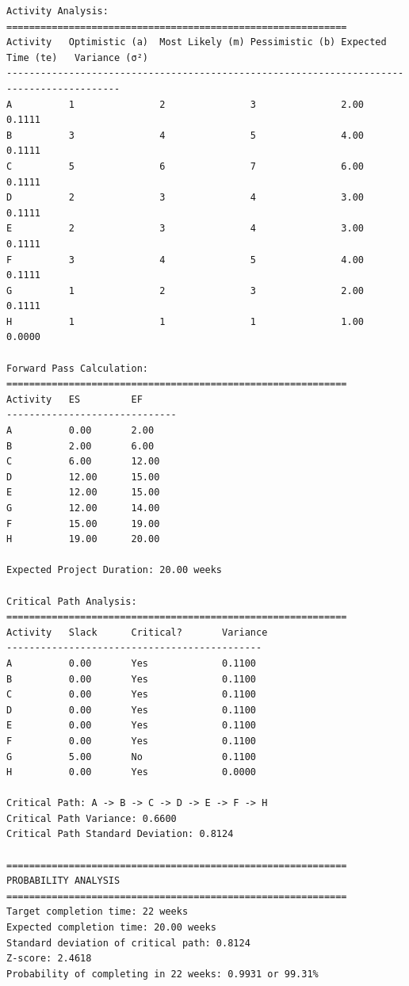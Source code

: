 \documentclass[
  letterpaper,
  DIV=11,
  numbers=noendperiod]{scrreprt}
\begin{document}
\begin{verbatim}
Activity Analysis:
============================================================
Activity   Optimistic (a)  Most Likely (m) Pessimistic (b) Expected Time (te)   Variance (σ²)  
------------------------------------------------------------------------------------------
A          1               2               3               2.00                 0.1111         
B          3               4               5               4.00                 0.1111         
C          5               6               7               6.00                 0.1111         
D          2               3               4               3.00                 0.1111         
E          2               3               4               3.00                 0.1111         
F          3               4               5               4.00                 0.1111         
G          1               2               3               2.00                 0.1111         
H          1               1               1               1.00                 0.0000         

Forward Pass Calculation:
============================================================
Activity   ES         EF        
------------------------------
A          0.00       2.00      
B          2.00       6.00      
C          6.00       12.00     
D          12.00      15.00     
E          12.00      15.00     
G          12.00      14.00     
F          15.00      19.00     
H          19.00      20.00     

Expected Project Duration: 20.00 weeks

Critical Path Analysis:
============================================================
Activity   Slack      Critical?       Variance  
---------------------------------------------
A          0.00       Yes             0.1100    
B          0.00       Yes             0.1100    
C          0.00       Yes             0.1100    
D          0.00       Yes             0.1100    
E          0.00       Yes             0.1100    
F          0.00       Yes             0.1100    
G          5.00       No              0.1100    
H          0.00       Yes             0.0000    

Critical Path: A -> B -> C -> D -> E -> F -> H
Critical Path Variance: 0.6600
Critical Path Standard Deviation: 0.8124

============================================================
PROBABILITY ANALYSIS
============================================================
Target completion time: 22 weeks
Expected completion time: 20.00 weeks
Standard deviation of critical path: 0.8124
Z-score: 2.4618
Probability of completing in 22 weeks: 0.9931 or 99.31%


\end{verbatim}
\end{document}

